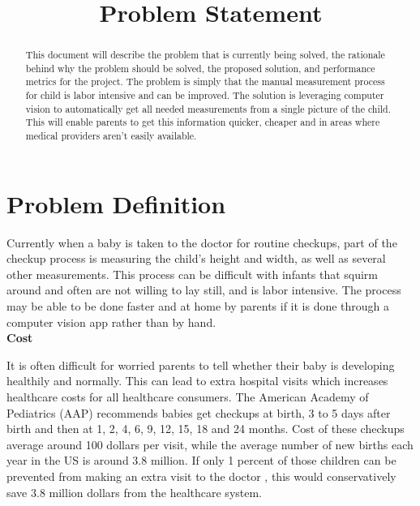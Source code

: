 \documentclass[10pt, draftclsnofoot, letterpaper, margin=.75in, onecolumn]{IEEEtran}
\begin{document}
\renewcommand{\familydefault}{\sfdefault}

\title{Problem Statement}
\author{
}

\begin{titlepage}
\maketitle
\begin{abstract}
This document will describe the problem that is currently being solved, the rationale behind why the problem should be solved, the proposed solution, and performance metrics for the project. The problem is simply that the manual measurement process for child is labor intensive and can be improved. The solution is leveraging computer vision to automatically get all needed measurements from a single picture of the child. This will enable parents to get this information quicker, cheaper and in areas where medical providers aren’t easily available.
\end{abstract}

\end{titlepage}


\section{Problem Definition}
\par Currently when a baby is taken to the doctor for routine checkups, part of the checkup process is measuring the child's height and width, as well as several other measurements. This process can be difficult with infants that squirm around and often are not willing to lay still, and is labor intensive.  The process may be able to be done faster and at home by parents if it is done through a computer vision app rather than by hand.\\

\textbf{Cost}
\par It is often difficult for worried parents to tell whether their baby is developing healthily and normally. This can lead to extra hospital visits which increases healthcare costs for all healthcare consumers. The American Academy of Pediatrics (AAP) recommends babies get checkups at birth, 3 to 5 days after birth and then at 1, 2, 4, 6, 9, 12, 15, 18 and 24 months\cite{checkup}. Cost of these checkups average around 100 dollars per visit\cite{cost}, while the average number of new births each year in the US is around 3.8 million\cite{births}. If only 1 percent of those children can be prevented from making an extra visit to the doctor , this would conservatively save 3.8 million dollars from the healthcare system.\\
\end{document}
